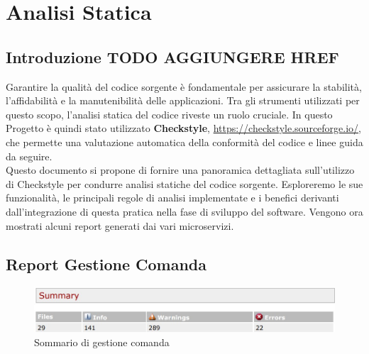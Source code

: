 \section{Analisi Statica}

\subsection{Introduzione TODO AGGIUNGERE HREF}

Garantire la qualità del codice sorgente è fondamentale per assicurare la stabilità, l'affidabilità e la manutenibilità delle applicazioni. Tra gli strumenti utilizzati per questo scopo, l'analisi statica del codice riveste un ruolo cruciale. In questo Progetto è quindi stato utilizzato \textbf{Checkstyle}, \href{https://checkstyle.sourceforge.io/}{https://checkstyle.sourceforge.io/}, che permette una valutazione automatica della conformità del codice e linee guida da seguire.
\\
Questo documento si propone di fornire una panoramica dettagliata sull'utilizzo di Checkstyle per condurre analisi statiche del codice sorgente. Esploreremo le sue funzionalità, le principali regole di analisi implementate e i benefici derivanti dall'integrazione di questa pratica nella fase di sviluppo del software. Vengono ora mostrati alcuni report generati dai vari microservizi.

\newpage

\subsection{Report Gestione Comanda}

\begin{figure}[htbp]
	\centering
	\includegraphics[scale=0.6]{iterazione1/images/Cs_Summary_Gestione_Comanda.jpg}
	\caption{Sommario di gestione comanda\label{fig:Cs_Summary_Gestione_Comanda}}
\end{figure}

